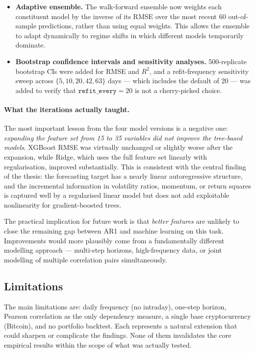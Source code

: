 \begin{itemize}
          0.05~$\to$~0.02, added $L_1/L_2$ penalties), reflecting the insight that
          the expanded feature set increased overfitting risk for tree-based methods.
    \item \textbf{Adaptive ensemble.}
          The walk-forward ensemble now weights each constituent model by the inverse of
          its RMSE over the most recent 60 out-of-sample predictions, rather than using
          equal weights.
          This allows the ensemble to adapt dynamically to regime shifts in which
          different models temporarily dominate.
    \item \textbf{Bootstrap confidence intervals and sensitivity analyses.}
          500-replicate bootstrap CIs were added for RMSE and $R^2$,
          and a refit-frequency sensitivity sweep across
          $\{5, 10, 20, 42, 63\}$ days --- which includes the default of 20 ---
          was added to verify that $\texttt{refit\_every} = 20$ is not a
          cherry-picked choice.
\end{itemize}

\paragraph{What the iterations actually taught.}
The most important lesson from the four model versions is a negative one:
\emph{expanding the feature set from 15 to 35 variables did not improve the tree-based models}.
XGBoost RMSE was virtually unchanged or slightly worse after the expansion, while Ridge,
which uses the full feature set linearly with regularisation, improved substantially.
This is consistent with the central finding of the thesis: the forecasting target has
a nearly linear autoregressive structure, and the incremental information in
volatility ratios, momentum, or return squares is captured well by a regularised linear
model but does not add exploitable nonlinearity for gradient-boosted trees.

The practical implication for future work is that \emph{better features} are unlikely to
close the remaining gap between AR1 and machine learning on this task.
Improvements would more plausibly come from a fundamentally different modelling approach
--- multi-step horizons, high-frequency data, or joint modelling of multiple correlation pairs
simultaneously.

\subsection{Limitations}

The main limitations are: daily frequency (no intraday), one-step horizon, Pearson correlation as the only dependency measure, a single base cryptocurrency (Bitcoin), and no portfolio backtest. Each represents a natural extension that could sharpen or complicate the findings. None of them invalidates the core empirical results within the scope of what was actually tested.
